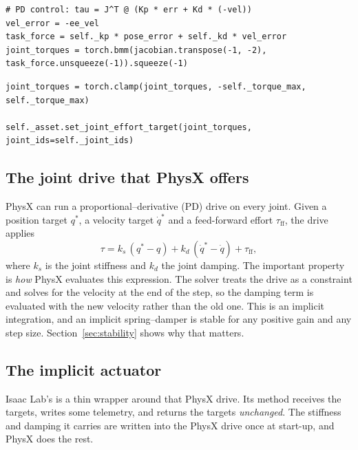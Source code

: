 \begin{snippetbox}[10]
\begin{lstlisting}[firstnumber=177]
# PD control: tau = J^T @ (Kp * err + Kd * (-vel))
vel_error = -ee_vel
task_force = self._kp * pose_error + self._kd * vel_error
joint_torques = torch.bmm(jacobian.transpose(-1, -2), task_force.unsqueeze(-1)).squeeze(-1)
\end{lstlisting}
\snippetelide
\begin{lstlisting}[firstnumber=192]
joint_torques = torch.clamp(joint_torques, -self._torque_max, self._torque_max)

self._asset.set_joint_effort_target(joint_torques, joint_ids=self._joint_ids)
\end{lstlisting}
\end{snippetbox}

\subsection{The joint drive that PhysX offers}

PhysX can run a proportional--derivative (PD) drive on every joint. Given a position target $q^\ast$, a velocity target $\dot q^\ast$ and a feed-forward effort $\tau_{\mathrm{ff}}$, the drive applies
\begin{equation}
  \tau = k_s\,(q^\ast - q) + k_d\,(\dot q^\ast - \dot q) + \tau_{\mathrm{ff}},
  \label{eq:drive}
\end{equation}
where $k_s$ is the joint stiffness and $k_d$ the joint damping. The important property is \emph{how} PhysX evaluates this expression. The solver treats the drive as a constraint and solves for the velocity at the end of the step, so the damping term is evaluated with the new velocity rather than the old one. This is an implicit integration, and an implicit spring--damper is stable for any positive gain and any step size. Section~\ref{sec:stability} shows why that matters.

\subsection{The implicit actuator}

Isaac Lab's  is a thin wrapper around that PhysX drive. Its  method receives the targets, writes some telemetry, and returns the targets \emph{unchanged}. The stiffness and damping it carries are written into the PhysX drive once at start-up, and PhysX does the rest.

